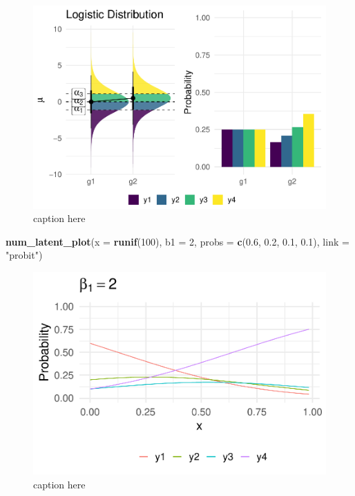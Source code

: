 \documentclass[
  man,floatsintext]{apa6}
\newenvironment{Shaded}{\begin{snugshade}}{\end{snugshade}}
\newcommand{\AttributeTok}[1]{\textcolor[rgb]{0.13,0.29,0.53}{#1}}
\newcommand{\DecValTok}[1]{\textcolor[rgb]{0.00,0.00,0.81}{#1}}
\newcommand{\FloatTok}[1]{\textcolor[rgb]{0.00,0.00,0.81}{#1}}
\newcommand{\FunctionTok}[1]{\textcolor[rgb]{0.13,0.29,0.53}{\textbf{#1}}}
\newcommand{\NormalTok}[1]{#1}
\newcommand{\StringTok}[1]{\textcolor[rgb]{0.31,0.60,0.02}{#1}}
\begin{document}
\begin{figure}

{\centering \includegraphics{paper-new_files/figure-latex/fig-example-cat-latent-1} 

}

\caption{caption here}\label{fig:fig-example-cat-latent}
\end{figure}

\normalsize

\scriptsize

\begin{Shaded}
\begin{Highlighting}[]
\FunctionTok{num\_latent\_plot}\NormalTok{(}\AttributeTok{x =} \FunctionTok{runif}\NormalTok{(}\DecValTok{100}\NormalTok{), }\AttributeTok{b1 =} \DecValTok{2}\NormalTok{, }\AttributeTok{probs =} \FunctionTok{c}\NormalTok{(}\FloatTok{0.6}\NormalTok{, }\FloatTok{0.2}\NormalTok{, }\FloatTok{0.1}\NormalTok{, }\FloatTok{0.1}\NormalTok{), }\AttributeTok{link =} \StringTok{"probit"}\NormalTok{)}
\end{Highlighting}
\end{Shaded}

\begin{figure}

{\centering \includegraphics{paper-new_files/figure-latex/fig-example-num-latent-1} 

}

\caption{caption here}\label{fig:fig-example-num-latent}
\end{figure}
\end{document}
